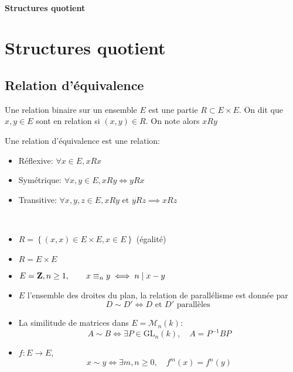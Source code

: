 \ifsolo
    ~

    \vspace{1cm}

    \begin{center}
        \textbf{\LARGE Structures quotient} \\[1em]
    \end{center}
    \tableofcontents
\else
    \chapter{Structures quotient}

    \minitoc
\fi
\thispagestyle{empty}

\section{Relation d'équivalence}

\begin{dfn}
    Une relation binaire sur un ensemble $E$ est une partie  $R\subset E\times E$. On dit que  $x, y \in  E$ sont en relation si $(x, y)\in  R$. On note alors $xRy$
\end{dfn}

\begin{dfn}
    Une relation d'équivalence est une relation: \begin{itemize}
        \item Réflexive: $\forall  x \in  E, xRx$
            \item Symétrique: $\forall  x, y \in  E, xRy \iff  yRx$
            \item Transitive: $\forall  x, y, z \in  E, xRy \text{ et }yRz \implies xRz$
    \end{itemize}
\end{dfn}

\begin{ex}~
\begin{itemize}
    \item $R= \left\{ (x, x) \in  E\times E, x \in  E \right\} $ (égalité)
    \item $R = E\times E$
    \item  $E = \mathbf Z, n\geq 1, \qquad  x\equiv_n y \iff  n \mid x-y$
    \item $E$ l'ensemble des droites du plan, la relation de parallélisme est donnée par  \[
            D\sim D' \iff  D \text{ et } D' \text{ parallèles }
    \] 
\item La similitude de matrices dans  $E=\mathcal  M_n(k)$: \[
    A\sim B \iff  \exists P \in  \mathrm{GL}_n(k), \quad  A=P^{-1}BP
\]
\item $f:E\longrightarrow E$,  \[
        x\sim y \iff  \exists m,n\geq 0, \quad  f^m(x)=f^n(y)
\] 
\end{itemize}
\end{ex}


